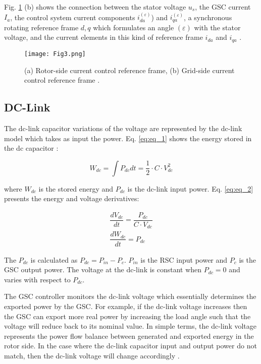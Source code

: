 \documentclass[conference,11pt]{IEEEtran}
\begin{document}
Fig. \ref{f:fig3_label} (b) shows the connection between the stator voltage $u_s$, the GSC current $I_a$, the control system current components $i_{da}^{(\varepsilon)}$) and $i_{qa}^{(\varepsilon)}$, a synchronous rotating reference frame ${d,q}$ which formulates an angle $(\varepsilon)$ with the stator voltage, and the current elements in this kind of reference frame $i_{da}$ and $i_{qa}$ \cite{ref10}. 



\begin{figure}[t]
  \centering
  \texttt{[image: Fig3.png]}
  \caption{(a) Rotor-side current control reference frame,  (b) Grid-side current control reference frame \cite{ref10}.}
  \label{f:fig3_label}
\end{figure} 

\subsection{DC-Link}

The dc-link capacitor variations of the voltage are represented by the dc-link model which takes as input the power. Eq. \ref{eq:eq_1} shows the energy stored in the dc capacitor \cite{ref10}:

\begin{equation}
    \label{eq:eq_1}
    W_{dc} = \int P_{dc} dt = \frac{1}{2} \cdot C \cdot V_{dc}^2
\end{equation}

{\setlength{\parindent}{0cm}
where $W_{dc}$ is the stored energy and $P_{dc}$ is the dc-link input power. Eq. \ref{eq:eq_2}} presents the energy and voltage derivatives:


\begin{equation}
\begin{split}
    \label{eq:eq_2}
    \dfrac{dV_{dc}}{dt} = \dfrac{P_{dc}}{C \cdot V_{dc}} \\
    \dfrac{dW_{dc}}{dt} = P_{dc}
\end{split}
\end{equation}

{\setlength{\parindent}{0cm}
The $P_{dc}$ is calculated as $P_{dc} = P_{in} -  P_{c}$. $P_{in}$ is the RSC input power and $P_c$ is the GSC output power. The voltage at the dc-link is constant when $P_{dc} = 0$ and varies with respect to $P_{dc}$.}


The GSC controller monitors the dc-link voltage which essentially determines the exported power by the GSC. For example, if the dc-link voltage increases then the GSC can export more real power by increasing the load angle such that the voltage will reduce back to its nominal value. In simple terms, the dc-link voltage represents the power flow balance between generated and exported energy in the rotor side. In the case where the dc-link capacitor input and output power do not match, then the dc-link voltage will change accordingly \cite{ref14}.
\end{document}
